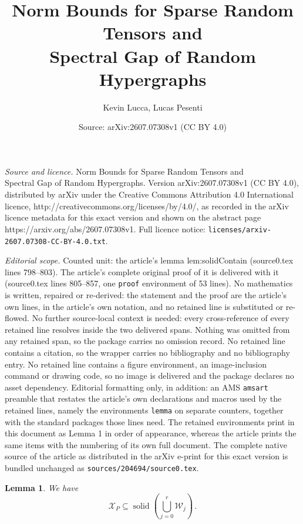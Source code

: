 \documentclass[10pt,a4paper]{amsart}
\title{Norm Bounds for Sparse Random Tensors and\\ Spectral Gap of Random Hypergraphs}
\author{Kevin Lucca, Lucas Pesenti}
\date{Source: arXiv:2607.07308v1 (CC BY 4.0)}
\newtheorem{lemma}{Lemma}
\newcommand{\calW}{\mathcal{W}}
\newcommand{\calX}{\mathcal{X}}
\DeclareMathOperator{\solid}{solid}
\begin{document}
\maketitle

\noindent\emph{Source and licence.} Norm Bounds for Sparse Random Tensors and\\ Spectral Gap of Random Hypergraphs. Version arXiv:2607.07308v1 (CC BY 4.0), distributed by arXiv under the Creative Commons Attribution 4.0 International licence, http://creativecommons.org/licenses/by/4.0/, as recorded in the arXiv licence metadata for this exact version and shown on the abstract page https://arxiv.org/abs/2607.07308v1. Full licence notice: \texttt{licenses/arxiv-2607.07308-CC-BY-4.0.txt}.\par\smallskip

\noindent\textit{Editorial scope.} Counted unit: the article's lemma lem:solidContain (source0.tex lines 798--803). The article's complete original proof of it is delivered with it (source0.tex lines 805--857, one \texttt{proof} environment of 53 lines). No mathematics is written, repaired or re-derived: the statement and the proof are the article's own lines, in the article's own notation, and no retained line is substituted or re-flowed.  No further source-local context is needed: every cross-reference of every retained line resolves inside the two delivered spans.  Nothing was omitted from any retained span, so the package carries no omission record.  No retained line contains a citation, so the wrapper carries no bibliography and no bibliography entry.  No retained line contains a figure environment, an image-inclusion command or drawing code, so no image is delivered and the package declares no asset dependency.  Editorial formatting only, in addition: an AMS \texttt{amsart} preamble that restates the article's own declarations and macros used by the retained lines, namely the environments \texttt{lemma} on separate counters, together with the standard packages those lines need.  The retained environments print in this document as Lemma 1 in order of appearance, whereas the article prints the same items with the numbering of its own full document.  The complete native source of the article as distributed in the arXiv e-print for this exact version is bundled unchanged as \texttt{sources/204694/source0.tex}.
\begin{lemma} \label{lem:solidContain}
    We have
    \[  
        \calX_P \subseteq \solid\left(\bigcup\limits_{j=0}^r \calW_j\right)\,.
    \]
\end{lemma}
\end{document}
